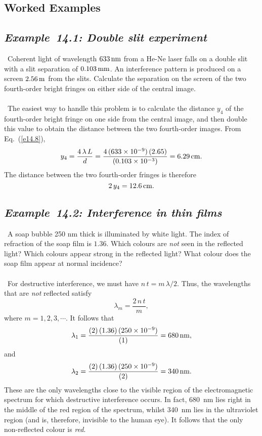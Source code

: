 \subsection{Worked Examples}
\subsection*{\em Example~14.1: Double slit experiment}
~Coherent light of wavelength $633\,{\rm nm}$ from a
He-Ne laser falls on a double slit with a slit separation of $0.103\,{\rm mm}$. 
An interference pattern is produced on a screen $2.56\,{\rm m}$ from the slits.
Calculate the separation on the screen of the two fourth-order bright
fringes on either side of the central image.\\
~\\
~The easiest way to handle this problem is to calculate
the distance $y_4$ of the fourth-order bright fringe on one side from the
central image, and then  double this value to obtain the distance
between the two fourth-order images. From Eq.~(\ref{e14.8}),
$$
y_4 = \frac{4\,\lambda\,L}{d} =\frac{4\,(633\times 10^{-9})\,(2.65)}{(0.103\times
10^{-3})} = 6.29\,{\rm cm}.
$$
The distance between the two fourth-order fringes is therefore
$$
2\,y_4 = 12.6\,{\rm cm}.
$$


\subsection*{\em Example~14.2: Interference in thin films}
~A soap bubble 250 nm thick is illuminated
by white light. The index of refraction of the soap film is $1.36$.
Which colours are {\em not}\/ seen in the reflected light? Which colours
appear strong in the reflected light? What colour does the soap film
appear at normal incidence?\\
~\\
~For destructive interference, we must have
$n\,t=m\,\lambda/2$. Thus, the wavelengths that are {\em not}\/
reflected satisfy
$$
\lambda_m = \frac{2\,n\,t}{m},
$$
where $m=1,2,3,\cdots$. It follows that
$$
\lambda_1 = \frac{(2)\,(1.36)\,(250\times 10^{-9})}{(1)} = 680\,{\rm nm},
$$
and
$$
\lambda_2 = \frac{(2)\,(1.36)\,(250\times 10^{-9})}{(2)} = 340\,{\rm nm}.
$$
These are the only wavelengths close to the visible region of the
electromagnetic spectrum for which destructive interference occurs.
In fact, 680~nm lies right in the middle of the red region of the
spectrum, whilst 340~nm lies in the ultraviolet region (and is,
therefore, invisible to the human eye). It follows that the only
non-reflected colour is {\em red}.

